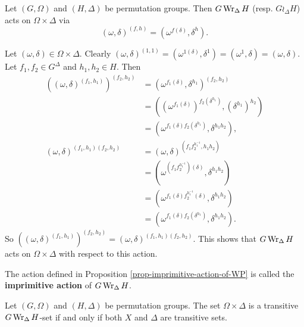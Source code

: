 \begin{proposition} \label{prop-imprimitive-action-of-WP}
	Let $(G,\Omega)$ and $(H,\Delta)$ be permutation groups. Then $G\operatorname{Wr}_\Delta H$ (resp. $G\wr_\Delta H$) acts on $\Omega\times \Delta$ via
	\begin{equation*}
		(\omega,\delta)^{(f,h)} = (\omega^{f(\delta)},\delta^h).
	\end{equation*} 
\end{proposition}
\begin{sketch}
	Let $(\omega,\delta)\in \Omega\times \Delta$. 
	Clearly $(\omega,\delta)^{(1,1)} =  (\omega^{1(\delta)},\delta^1) = (\omega^{1},\delta) = (\omega,\delta)$. Let $f_1,f_2\in G^\Delta$ and $h_1,h_2\in H$. Then  
\begin{align*}
	((\omega,\delta)^{(f_1,h_1)})^{(f_2,h_2)} &= (\omega^{f_1(\delta)},\delta^{h_1})^{(f_2,h_2)} 
	\\
	&= ((\omega^{f_1(\delta)})^{f_2(\delta^{h_1})},(\delta^{h_1})^{h_2})
	\\
	&= (\omega^{f_1(\delta)f_2(\delta^{h_1})},\delta^{h_1h_2}),
	\\
	(\omega,\delta)^{(f_1,h_1)(f_2,h_2)} &= (\omega,\delta)^{(f_1f_2^{h_1^{-1}},h_1h_2)}
	\\
	&= (\omega^{(f_1f_2^{h_1^{-1}})(\delta)},\delta^{h_1h_2})
	\\
	&= (\omega^{f_1(\delta)f_2^{h_1^{-1}}(\delta)},\delta^{h_1h_2})
	\\
	&= (\omega^{f_1(\delta)f_2(\delta^{h_1})},\delta^{h_1h_2}).
\end{align*}
So $((\omega,\delta)^{(f_1,h_1)})^{(f_2,h_2)}  = (\omega,\delta)^{(f_1,h_1)(f_2,h_2)}$. This shows that $G\operatorname{Wr}_{\Delta} H$ acts on $\Omega\times \Delta$ with respect to this action.
\end{sketch}
\begin{definition}
	The action defined in Proposition \ref{prop-imprimitive-action-of-WP} is called the \textbf{imprimitive action} of $G\operatorname{Wr}_{\Delta} H$.
\end{definition}

\begin{proposition}
	Let $(G,\Omega)$ and $(H,\Delta)$ be permutation groups. The set $\Omega\times \Delta$ is a transitive $G\operatorname{Wr}_\Delta H$-set if and only if both $X$ and $\Delta$ are transitive sets.
\end{proposition}

